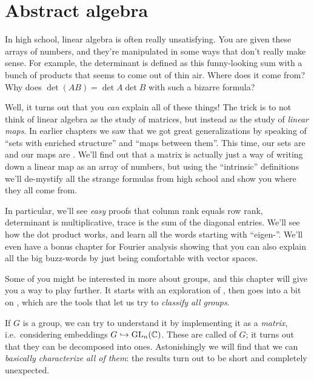 \section{Abstract algebra}
\begin{itemize}
In high school, linear algebra is often really unsatisfying.
You are given these arrays of numbers,
and they're manipulated in some ways that don't really make sense.
For example, the determinant is defined as this
funny-looking sum with a bunch of products that seems
to come out of thin air. Where does it come from?
Why does $\det(AB) = \det A \det B$ with such a bizarre formula?

Well, it turns out that you \emph{can} explain all of these things!
The trick is to not think of linear algebra
as the study of matrices,
but instead as the study of \emph{linear maps}.
In earlier chapters we saw that we got great generalizations
by speaking of ``sets with enriched structure'' and ``maps between them''.
This time, our sets are 
and our maps are .
We'll find out that a matrix is actually just
a way of writing down a linear map as an array of numbers,
but using the ``intrinsic'' definitions
we'll de-mystify all the strange formulas from high school
and show you where they all come from.

In particular, we'll see \emph{easy} proofs
that column rank equals row rank,
determinant is multiplicative, trace is the sum of the diagonal entries.
We'll see how the dot product works,
and learn all the words starting with ``eigen-''.
We'll even have a bonus chapter for Fourier analysis
showing that you can also explain all the big buzz-words
by just being comfortable with vector spaces.

Some of you might be interested in more about groups,
and this chapter will give you a way to play further.
It starts with an exploration of ,
then goes into a bit on ,
which are the tools that let us try to \emph{classify all groups}.

If $G$ is a group, we can try to understand
it by implementing it as a \emph{matrix},
i.e.\ considering embeddings $G \hookrightarrow \operatorname{GL}_n(\mathbb C)$.
These are called  of $G$;
it turns out that they can be decomposed into  ones.
Astonishingly we will find that we can
\emph{basically characterize all of them}:
the results turn out to be short and completely unexpected.


\end{itemize}
